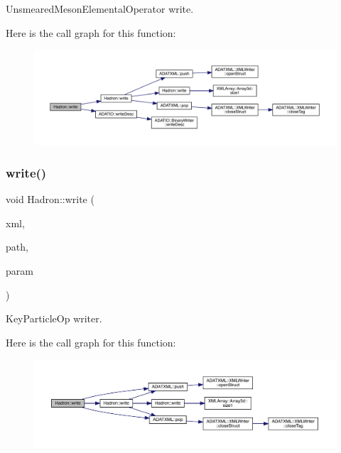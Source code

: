 Unsmeared\+Meson\+Elemental\+Operator write. 

Here is the call graph for this function\+:
\nopagebreak
\begin{figure}[H]
\begin{center}
\leavevmode
\includegraphics[width=350pt]{d1/daf/namespaceHadron_ac88cbe3678a2276ee3dd2d55fff0cabf_cgraph}
\end{center}
\end{figure}
\mbox{\label{namespaceHadron_a1aaa6594011475e4142807cfbf0b78e9}} 
\subsubsection{\texorpdfstring{write()}{write()}\hspace{0.1cm}{\footnotesize\ttfamily [29/95]}}
{\footnotesize\ttfamily void Hadron\+::write (\begin{DoxyParamCaption}\item[{\mbox{\hyperlink{classADATXML_1_1XMLWriter}{X\+M\+L\+Writer}} \&}]{xml,  }\item[{const std\+::string \&}]{path,  }\item[{const \mbox{\hyperlink{structHadron_1_1KeyParticleOp__t}{Key\+Particle\+Op\+\_\+t}} \&}]{param }\end{DoxyParamCaption})}



Key\+Particle\+Op writer. 

Here is the call graph for this function\+:
\nopagebreak
\begin{figure}[H]
\begin{center}
\leavevmode
\includegraphics[width=350pt]{d1/daf/namespaceHadron_a1aaa6594011475e4142807cfbf0b78e9_cgraph}
\end{center}
\end{figure}
\mbox{\label{namespaceHadron_abf12b2168d7e3741fcc320bf4b8c53df}} 

